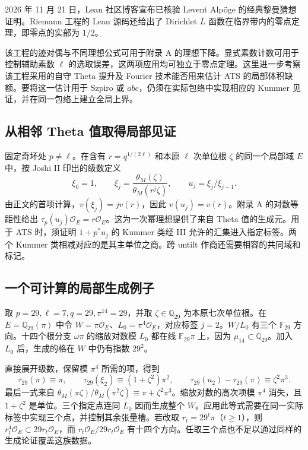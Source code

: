 \documentclass[UTF8,fontset=none,zihao=-4,a4paper]{ctexart}
\newcommand{\OO}{\mathcal O}
\newcommand{\Q}{\mathbb Q}
\begin{document}
2026 年 11 月 21 日，Lean 社区博客宣布已核验 Levent Alpöge 的经典黎曼猜想证明。Riemann 工程的 Lean 源码还给出了 Dirichlet \(L\) 函数在临界带内的零点定理，即零点的实部为 \(1/2\)。\cite{riemblog,riemcode}

该工程的迹对偶与不同理想公式可用于附录 A 的理想下降。显式素数计数可用于控制辅助素数 \(\ell\) 的选取误差，这两项应用均可独立于零点定理。这里进一步考察该工程采用的自守 Theta 提升及 Fourier 技术能否用来估计 ATS 的局部体积缺额。要将这一估计用于 Szpiro 或 \(abc\)，仍须在实际包络中实现相应的 Kummer 见证，并在同一包络上建立全局上界。\cite{riemcode,riemtheta}

\subsection{从相邻 Theta 值取得局部见证}
固定奇坏处 \(p\ne\ell\)。在含有 \(r=q^{1/(2\ell)}\) 和本原 \(\ell\) 次单位根 \(\zeta\) 的同一个局部域 \(E\) 中，按 Joshi II 印出的级数定义
\[
 \xi_0=1,\qquad \xi_j=\frac{\theta_M(\zeta)}{\theta_M(r^j\zeta)},\qquad
 u_j=\xi_j/\xi_{j-1}.
\]
由正文的首项计算，\(v(\xi_j)=jv(r)\)，因此 \(v(u_j)=v(r)\)。附录 A 的对数等距性给出 \(\tau_p(u_j)\OO_E=r\OO_E\)。这为一次幂理想提供了来自 Theta 值的生成元。用于 ATS 时，须证明 \(1+p^*u_j\) 的 Kummer 类经 III 允许的汇集进入指定标签。两个 Kummer 类相减对应的是其主单位之商。跨 untilt 作商还需要相容的共同域和标记。\cite{jii,jiii}

\subsection{一个可计算的局部生成例子}
取 \(p=29,\ell=7,q=29,\pi^{14}=29\)，并取 \(\zeta\in\Q_{29}\) 为本原七次单位根。在 \(E=\Q_{29}(\pi)\) 中令 \(W=\pi\OO_E\)、\(L_0=\pi^4\OO_E\)，对应标签 \(j=2\)。\(W/L_0\) 有三个 \(\mathbb F_{29}\) 方向。十四个根分支 \(\omega\pi\) 的缩放对数模 \(L_0\) 都在线 \(\mathbb F_{29}\pi\) 上，因为 \(\mu_{14}\subset\Q_{29}\)。加入 \(L_0\) 后，生成的格在 \(W\) 中仍有指数 \(29^2\)。

直接展开级数，保留模 \(\pi^4\) 所需的项，得到
\[
 \tau_{29}(\pi)\equiv\pi,\qquad
 \tau_{29}(\xi_2)\equiv(1+\zeta^2)\pi^2,\qquad
 \tau_{29}(u_2)-\tau_{29}(\pi)\equiv\zeta^2\pi^3.
\]
最后一式来自 \(\theta_M(\pi\zeta)/\theta_M(\pi^2\zeta)\equiv\pi+\zeta^2\pi^3\)。缩放对数的高次项模 \(\pi^4\) 消失，且 \(1+\zeta^2\) 是单位。三个指定点连同 \(L_0\) 因而生成整个 \(W\)。应用此等式需要在同一实际标签中实现三个点，并控制其余张量槽。若改取 \(r_t=29^t\pi\)（\(t\ge1\)），则 \(r_t^4\OO_E\subset29r_t\OO_E\)，而 \(r_t\OO_E/29r_t\OO_E\) 有十四个方向。任取三个点也不足以通过同样的生成论证覆盖这族数据。
\end{document}
